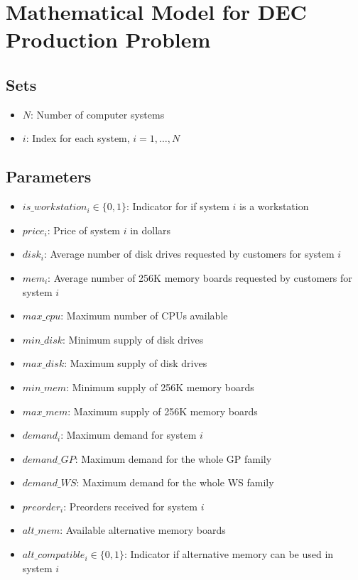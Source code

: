 \documentclass{article}
\begin{document}
\section*{Mathematical Model for DEC Production Problem}

\subsection*{Sets}
\begin{itemize}
    \item $N$: Number of computer systems
    \item $i$: Index for each system, $i = 1, \ldots, N$
\end{itemize}

\subsection*{Parameters}
\begin{itemize}
    \item $is\_workstation_i \in \{0, 1\}$: Indicator for if system $i$ is a workstation
    \item $price_i$: Price of system $i$ in dollars
    \item $disk_i$: Average number of disk drives requested by customers for system $i$
    \item $mem_i$: Average number of 256K memory boards requested by customers for system $i$
    \item $max\_cpu$: Maximum number of CPUs available
    \item $min\_disk$: Minimum supply of disk drives
    \item $max\_disk$: Maximum supply of disk drives
    \item $min\_mem$: Minimum supply of 256K memory boards
    \item $max\_mem$: Maximum supply of 256K memory boards
    \item $demand_i$: Maximum demand for system $i$
    \item $demand\_GP$: Maximum demand for the whole GP family
    \item $demand\_WS$: Maximum demand for the whole WS family
    \item $preorder_i$: Preorders received for system $i$
    \item $alt\_mem$: Available alternative memory boards
    \item $alt\_compatible_i \in \{0, 1\}$: Indicator if alternative memory can be used in system $i$
\end{itemize}
\end{document}
